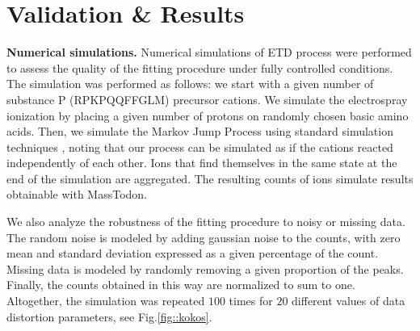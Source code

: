 \documentclass{llncs}
\begin{document}
\section{Validation \& Results}

\textbf{Numerical simulations.} Numerical simulations of ETD process were performed to assess the quality of the fitting procedure under fully controlled conditions. The simulation was performed as follows: we start with a given number of substance P (RPKPQQFFGLM) precursor cations. We simulate the electrospray ionization by placing a given number of protons on randomly chosen basic amino acids. Then, we simulate the Markov Jump Process using standard simulation techniques \cite{Gillespie1977-fr}, noting that our process can be simulated as if the cations reacted independently of each other. Ions that find themselves in the same state at the end of the simulation are aggregated. The resulting counts of ions simulate results obtainable with {\sc MassTodon}.

We also analyze the robustness of the fitting procedure to noisy or missing data. The random noise is modeled by adding gaussian noise to the counts, with zero mean and standard deviation expressed as a given percentage of the count. Missing data is modeled by randomly removing a given proportion of the peaks. Finally, the counts obtained in this way are normalized to sum to one. Altogether, the simulation was repeated $100$ times for $20$ different values of data distortion parameters, see Fig.\ref{fig::kokos}.
\end{document}
